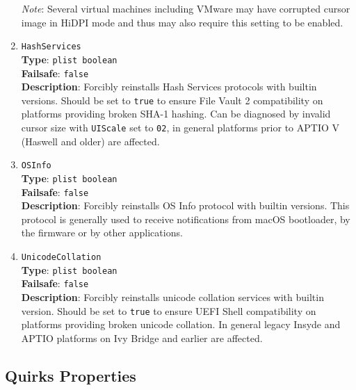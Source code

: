 \documentclass[]{article}
\makeatletter
\renewcommand{\label}[1]{%
\zref@wrapper@immediate{\oldlabel{#1}}}  %
\makeatother
\begin{document}
\begin{enumerate}
  \emph{Note}: Several virtual machines including VMware may have corrupted
  cursor image in HiDPI mode and thus may also require this setting to be enabled.

\item
  \texttt{HashServices}\\
  \textbf{Type}: \texttt{plist\ boolean}\\
  \textbf{Failsafe}: \texttt{false}\\
  \textbf{Description}: Forcibly reinstalls Hash Services protocols with builtin
  versions. Should be set to \texttt{true} to ensure File Vault 2 compatibility
  on platforms providing broken SHA-1 hashing. Can be diagnosed by invalid
  cursor size with \texttt{UIScale} set to \texttt{02}, in general platforms
  prior to APTIO V (Haswell and older) are affected.

\item
  \texttt{OSInfo}\\
  \textbf{Type}: \texttt{plist\ boolean}\\
  \textbf{Failsafe}: \texttt{false}\\
  \textbf{Description}: Forcibly reinstalls OS Info protocol with builtin
  versions. This protocol is generally used to receive notifications from macOS
  bootloader, by the firmware or by other applications.

\item
  \texttt{UnicodeCollation}\\
  \textbf{Type}: \texttt{plist\ boolean}\\
  \textbf{Failsafe}: \texttt{false}\\
  \textbf{Description}: Forcibly reinstalls unicode collation services with builtin
  version. Should be set to \texttt{true} to ensure UEFI Shell compatibility
  on platforms providing broken unicode collation. In general legacy Insyde and APTIO
  platforms on Ivy Bridge and earlier are affected.

\end{enumerate}

\subsection{Quirks Properties}\label{uefiquirkprops}
\end{document}
